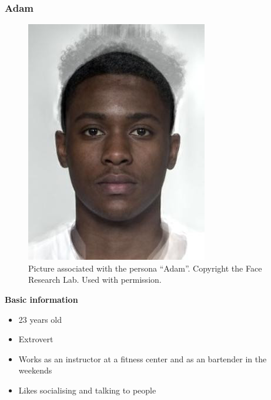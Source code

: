 \subsubsection{Adam}
\begin{figure} [h]
  \centering
  \includegraphics[]{Images/adam.jpg}
  \caption{Picture associated with the persona \enquote{Adam}. Copyright the Face Research Lab. Used with permission.}
  \label{fig:adam}
\end{figure}
\noindent\textbf{Basic information}
\begin{itemize}
\item 23 years old
\item Extrovert
\item Works as an instructor at a fitness center and as an bartender in the weekends
\item Likes socialising and talking to people
\end{itemize}

